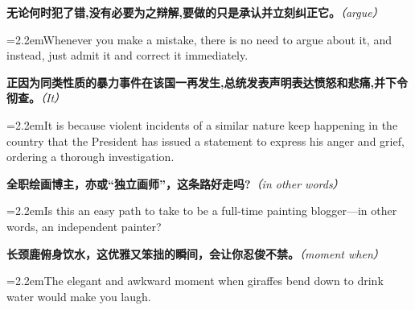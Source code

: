 \documentclass[11pt,a4paper]{article}
\newcommand{\num}[1]{\makebox[1.9em][r]{#1.}\hspace{0.3em}}
\newcommand{\prompt}[1]{\emph{\textcolor{tipblue}{\small（#1）}}}
\begin{document}
\begin{minipage}{\linewidth}

\num{31}\textbf{无论何时犯了错,没有必要为之辩解,要做的只是承认并立刻纠正它。}\prompt{argue}

\vspace{0.15em}

\noindent\hangindent=2.2em\hspace{2.2em}Whenever you make a mistake, there is no need to argue about it, and instead, just admit it and correct it immediately.

\end{minipage}

\begin{minipage}{\linewidth}

\num{32}\textbf{正因为同类性质的暴力事件在该国一再发生,总统发表声明表达愤怒和悲痛,并下令彻查。}\prompt{It}

\vspace{0.15em}

\noindent\hangindent=2.2em\hspace{2.2em}It is because violent incidents of a similar nature keep happening in the country that the President has issued a statement to express his anger and grief, ordering a thorough investigation.

\end{minipage}

\vspace{0.35em}\vspace{0.15em}

\begin{minipage}{\linewidth}

\num{33}\textbf{全职绘画博主，亦或“独立画师”，这条路好走吗?}\prompt{in other words}

\vspace{0.15em}

\noindent\hangindent=2.2em\hspace{2.2em}Is this an easy path to take to be a full-time painting blogger—in other words, an independent painter?

\end{minipage}

\begin{minipage}{\linewidth}

\num{34}\textbf{长颈鹿俯身饮水，这优雅又笨拙的瞬间，会让你忍俊不禁。}\prompt{moment when}

\vspace{0.15em}

\noindent\hangindent=2.2em\hspace{2.2em}The elegant and awkward moment when giraffes bend down to drink water would make you laugh.

\end{minipage}
\end{document}

